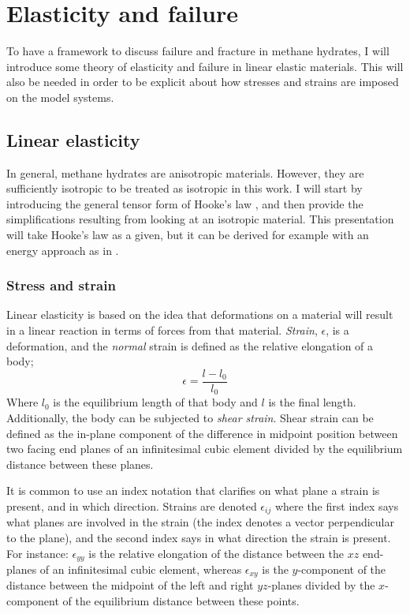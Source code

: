  \chapter{Elasticity and failure}
 To have a framework to discuss failure and fracture in methane hydrates, I will introduce some theory of elasticity and failure in linear elastic materials. This will also be needed in order to be explicit about how stresses and strains are imposed on the model systems.

 \section{Linear elasticity}
In general, methane hydrates are anisotropic materials. However, they are sufficiently isotropic to be treated as isotropic in this work. I will start by introducing the general tensor form of Hooke's law , and then provide the simplifications resulting from looking at an isotropic material. This presentation will take Hooke's law as a given, but it can be derived for example with an energy approach as in \citet[p.105]{Buehler2008}.

\subsection{Stress and strain}
Linear elasticity is based on the idea that deformations on a material will result in a linear reaction in terms of forces from that material. \emph{Strain}, $\epsilon$, is a deformation, and the \emph{normal} strain is defined as the relative elongation of a body;
\begin{equation}
	\epsilon = \frac{l-l_0}{l_0}
\end{equation}
Where $l_0$ is the equilibrium length of that body and $l$ is the final length. Additionally, the body can be subjected to \emph{shear strain}. Shear strain can be defined as the in-plane component of the difference in midpoint position between two facing end planes of an infinitesimal cubic element divided by the equilibrium distance between these planes.

It is common to use an index notation that clarifies on what plane a strain is present, and in which direction. Strains are denoted $\epsilon_{ij}$ where the first index says what planes are involved in the strain (the index denotes a vector perpendicular to the plane), and the second index says in what direction the strain is present. For instance: $\epsilon_{yy}$ is the relative elongation of the distance between the $xz$ end-planes of an infinitesimal cubic element, whereas $\epsilon_{xy}$ is the $y$-component of the distance between the midpoint of the left and right $yz$-planes divided by the $x$-component of the equilibrium distance between these points.

